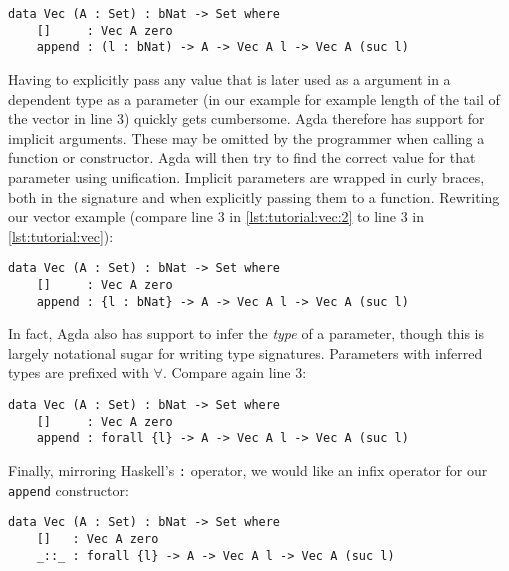 \begin{lstlisting}[caption={A simple vector type},label={lst:tutorial:vec},emph={Vec,append}]
data Vec (A : Set) : bNat -> Set where
    []     : Vec A zero
    append : (l : bNat) -> A -> Vec A l -> Vec A (suc l)
\end{lstlisting}

Having to explicitly pass any value that is later used as a argument in a dependent type as a parameter (in our example for example length of the tail of the vector in line 3) quickly gets cumbersome. Agda therefore has support for implicit arguments. These may be omitted by the programmer when calling a function or constructor. Agda will then try to find the correct value for that parameter using unification. Implicit parameters are wrapped in curly braces, both in the signature and when explicitly passing them to a function. Rewriting our vector example (compare line 3 in \autoref{lst:tutorial:vec:2} to line 3 in \autoref{lst:tutorial:vec}):

\noindent\begin{minipage}{\linewidth}
\begin{lstlisting}[caption={A simple vector type (implicit parameters)},label={lst:tutorial:vec:2},emph={Vec,append}]
data Vec (A : Set) : bNat -> Set where
    []     : Vec A zero
    append : {l : bNat} -> A -> Vec A l -> Vec A (suc l)
\end{lstlisting}
\end{minipage}

In fact, Agda also has support to infer the \emph{type} of a parameter, though this is largely notational sugar for writing type signatures. Parameters with inferred types are prefixed with $\forall$. Compare again line 3:

\begin{lstlisting}[caption={A simple vector type (type inferrence)},label={lst:tutorial:vec:3},emph={Vec,append}]
data Vec (A : Set) : bNat -> Set where
    []     : Vec A zero
    append : forall {l} -> A -> Vec A l -> Vec A (suc l)
\end{lstlisting}

Finally, mirroring Haskell's \texttt{:} operator, we would like an infix operator for our \texttt{append} constructor:

\begin{lstlisting}[caption={A simple vector type (infix operator)},label={lst:tutorial:vec:4},emph={Vec}]
data Vec (A : Set) : bNat -> Set where
    []   : Vec A zero
    _::_ : forall {l} -> A -> Vec A l -> Vec A (suc l)
\end{lstlisting}

